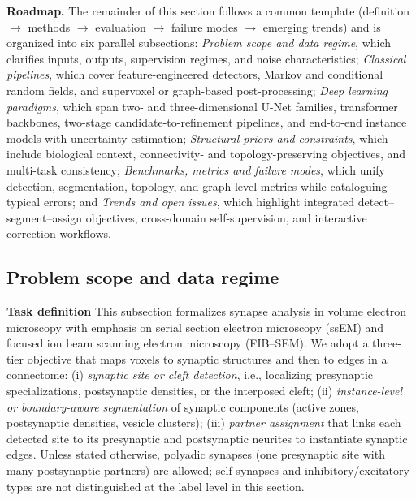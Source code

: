 \noindent\textbf{Roadmap.} The remainder of this section follows a common template (definition $\rightarrow$ methods $\rightarrow$ evaluation $\rightarrow$ failure modes $\rightarrow$ emerging trends) and is organized into six parallel subsections: \emph{Problem scope and data regime}, which clarifies inputs, outputs, supervision regimes, and noise characteristics; \emph{Classical pipelines}, which cover feature-engineered detectors, Markov and conditional random fields, and supervoxel or graph-based post-processing; \emph{Deep learning paradigms}, which span two- and three-dimensional U-Net families, transformer backbones, two-stage candidate-to-refinement pipelines, and end-to-end instance models with uncertainty estimation; \emph{Structural priors and constraints}, which include biological context, connectivity- and topology-preserving objectives, and multi-task consistency; \emph{Benchmarks, metrics and failure modes}, which unify detection, segmentation, topology, and graph-level metrics while cataloguing typical errors; and \emph{Trends and open issues}, which highlight integrated detect–segment–assign objectives, cross-domain self-supervision, and interactive correction workflows.

\subsection{Problem scope and data regime}

\noindent\textbf{Task definition}\;
This subsection formalizes synapse analysis in volume electron microscopy with emphasis on serial section electron microscopy (ssEM) and focused ion beam scanning electron microscopy (FIB--SEM). We adopt a three-tier objective that maps voxels to synaptic structures and then to edges in a connectome:
(i) \emph{synaptic site or cleft detection}, i.e., localizing presynaptic specializations, postsynaptic densities, or the interposed cleft;
(ii) \emph{instance-level or boundary-aware segmentation} of synaptic components (active zones, postsynaptic densities, vesicle clusters);
(iii) \emph{partner assignment} that links each detected site to its presynaptic and postsynaptic neurites to instantiate synaptic edges.
Unless stated otherwise, polyadic synapses (one presynaptic site with many postsynaptic partners) are allowed; self-synapses and inhibitory/excitatory types are not distinguished at the label level in this section.\par


